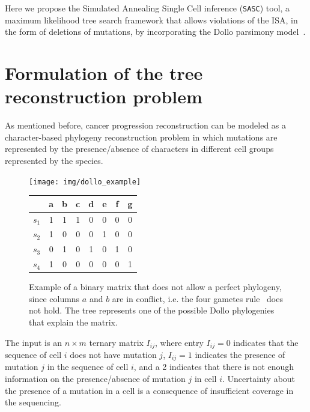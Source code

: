 \documentclass[a4paper,USenglish]{article}
\theoremstyle{definition}
\begin{document}
Here we propose the Simulated Annealing Single Cell inference (\texttt{SASC}) tool, a maximum likelihood tree search framework that allows violations of the ISA, in the form of deletions of mutations, by incorporating the Dollo parsimony model~\cite{Farris_1977}.

\section{Formulation of the tree reconstruction problem}
As mentioned before, cancer progression reconstruction can be modeled as a
character-based phylogeny reconstruction problem in which mutations
are represented by the presence/absence of characters in different 
cell groups represented by the species.
\begin{figure}[tb]
  \begin{minipage}{0.4\linewidth}
     \texttt{[image: img/dollo\_example]}
\end{minipage}
\begin{minipage}{0.3\linewidth}
        \begin{tabular}[!t]{c|ccccccc}
             & a & b & c & d & e & f & g  \\ \hline
            $s_1$ & 1 & 1 & 1 & 0 & 0 & 0 & 0 \\
            $s_2$ & 1 & 0 & 0 & 0 & 1 & 0 & 0 \\
            $s_3$ & 0 & 1 & 0 & 1 & 0 & 1 & 0 \\
            $s_4$ & 1 & 0 & 0 & 0 & 0 & 0 & 1
        \end{tabular}
        \end{minipage}
  \caption{Example of a binary matrix that does not allow a perfect phylogeny, since columns $a$ and $b$ are in conflict, i.e. the four gametes rule~\cite{gusfield1991}
  does not hold. The tree represents one of the possible Dollo phylogenies that explain the matrix.}
\label{fig:dollo}
\end{figure}

The input is an $n \times m$ ternary matrix $I_{ij}$, where entry $I_{ij}=0$ indicates
that the sequence of cell $i$ does not have mutation $j$, $I_{ij}=1$ indicates the presence of mutation $j$ in the sequence of cell $i$, and a 2 indicates
that there is not enough information on the presence/absence of mutation $j$ in cell $i$.
Uncertainty about the presence of a mutation in a cell is a consequence of insufficient coverage in the sequencing. 
\end{document}
